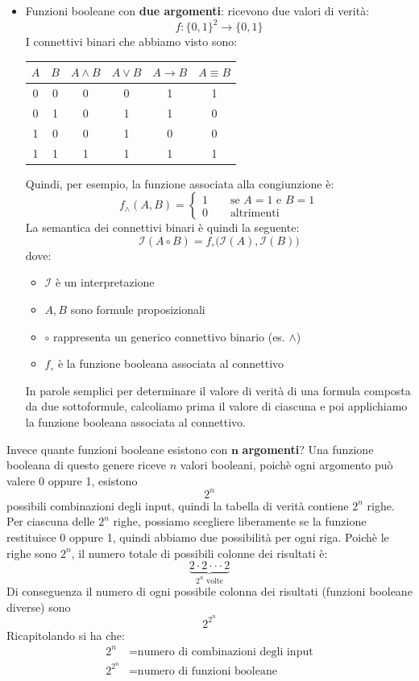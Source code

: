 \begin{itemize}
\item Funzioni booleane con \textbf{due argomenti}: ricevono due valori di verità:
\[     f: \{ 0,1 \}^2 \to \{ 0,1 \}    \]
I connettivi binari che abbiamo visto sono:
\begin{center}
    \renewcommand{\arraystretch}{1.5} %
    \begin{tabular}{|c|c|c|c|c|c|}
        \hline
        $A$ & $B$ & $A \land B$ & $A \lor B$ & $A \rightarrow B$ & $A \equiv B$ \\
        \hline
        0 & 0 & 0 & 0 & 1 & 1 \\
        0 & 1 & 0 & 1 & 1 & 0 \\
        1 & 0 & 0 & 1 & 0 & 0 \\
        1 & 1 & 1 & 1 & 1 & 1 \\
        \hline
    \end{tabular}
\end{center}
Quindi, per esempio, la funzione associata alla congiunzione è:
\[ f_{\wedge}(A,B) = \begin{cases}
    1 \qquad \text{se } A = 1 \text{ e } B = 1 \\
    0 \qquad \text{altrimenti}
\end{cases}   \]
La semantica dei connettivi binari è quindi la seguente:
\[  \mathcal{I}(A\circ B) = f_{\circ}\big(  \mathcal{I}(A), \mathcal{I}(B)      \big) \]
dove:
\begin{itemize}
    \item $\mathcal{I}$ è un interpretazione
    \item $A,B$ sono formule proposizionali
    \item $\circ$ rappresenta un generico connettivo binario (es. $\wedge$)
    \item $f_{\circ}$ è la funzione booleana associata al connettivo 
\end{itemize}
In parole semplici per determinare il valore di verità di una formula composta da due sottoformule, calcoliamo prima il valore di ciascuna e poi applichiamo la funzione booleana associata al connettivo.
\end{itemize} 

\noindent Invece quante funzioni booleane esistono con $\bm{n}$ \textbf{argomenti}? Una funzione booleana di questo genere riceve $n$
valori booleani, poichè ogni argomento può valere 0 oppure 1, esistono 
\[  2^n  \]
possibili combinazioni degli input, quindi la tabella di verità contiene $2^n$ righe. Per ciascuna delle $2^n$ righe, possiamo scegliere liberamente se la funzione restituisce 0 oppure 1, quindi abbiamo due possibilità
per ogni riga. Poichè le righe sono $2^n$, il numero totale di possibili colonne dei risultati è:
\[    \underbrace{2\cdot 2 \cdot\cdot\cdot 2}_{2^n \text{ volte}}    \]
Di conseguenza il numero di ogni possibile colonna dei risultati (funzioni booleane diverse) sono 
\[  2^{2^n}  \]
Ricapitolando si ha che:
\[
\boxed{
\begin{aligned}
2^n&=\text{numero di combinazioni degli input}\\
2^{2^n}&=\text{numero di funzioni booleane}
\end{aligned}
}
\]



